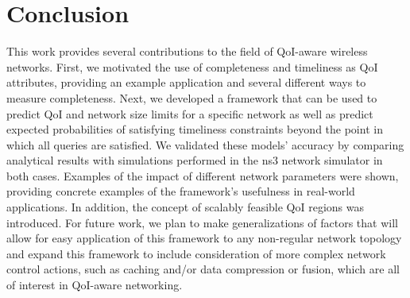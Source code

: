 \section{Conclusion}
\label{sec:conclusion}

This work provides several contributions to the field of QoI-aware wireless networks.  
First, we motivated the use of completeness and timeliness as QoI attributes, providing an example application and several different ways to measure completeness.  
Next, we developed a framework that can be used to predict QoI and network size limits for a specific network as well as predict expected probabilities of satisfying timeliness constraints beyond the point in which all queries are satisfied.  We validated these models' accuracy by comparing analytical results with simulations performed in the ns3 network simulator in both cases.
Examples of the impact of different network parameters were shown, providing concrete examples of the framework's usefulness in real-world applications.  In addition, the concept of scalably feasible QoI regions was introduced.
For future work, we plan to make generalizations of factors that will allow for easy application of this framework to any non-regular network topology and expand this framework to include consideration of more complex network control actions, such as caching and/or data compression or fusion, which are all of interest in QoI-aware networking.